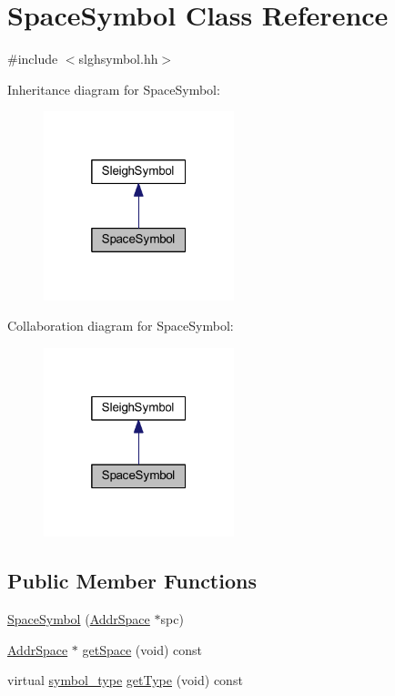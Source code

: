 \hypertarget{class_space_symbol}{}\section{Space\+Symbol Class Reference}
\label{class_space_symbol}


{\ttfamily \#include $<$slghsymbol.\+hh$>$}



Inheritance diagram for Space\+Symbol\+:
\nopagebreak
\begin{figure}[H]
\begin{center}
\leavevmode
\includegraphics[width=157pt]{class_space_symbol__inherit__graph}
\end{center}
\end{figure}


Collaboration diagram for Space\+Symbol\+:
\nopagebreak
\begin{figure}[H]
\begin{center}
\leavevmode
\includegraphics[width=157pt]{class_space_symbol__coll__graph}
\end{center}
\end{figure}
\subsection*{Public Member Functions}
\begin{DoxyCompactItemize}
\item 
\mbox{\hyperlink{class_space_symbol_a2a384f9010d6f8db0d515d4a3adcb643}{Space\+Symbol}} (\mbox{\hyperlink{class_addr_space}{Addr\+Space}} $\ast$spc)
\item 
\mbox{\hyperlink{class_addr_space}{Addr\+Space}} $\ast$ \mbox{\hyperlink{class_space_symbol_a25d2176392a721ae6dc112313a67eaae}{get\+Space}} (void) const
\item 
virtual \mbox{\hyperlink{class_sleigh_symbol_aba70f7f332fd63488c5ec4bd7807db41}{symbol\+\_\+type}} \mbox{\hyperlink{class_space_symbol_a29f9d6168864570751d9614cd04d827f}{get\+Type}} (void) const
\end{DoxyCompactItemize}
